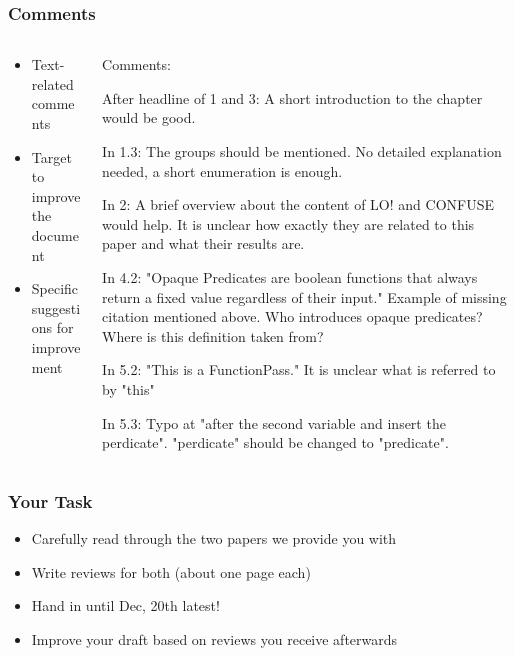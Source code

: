 \documentclass[xcolor={usenames,dvipsnames}]{beamer}
\begin{document}
\begin{frame}
	\frametitle{Comments}

	\begin{columns}
		\begin{column}{0.5\linewidth}
			\begin{itemize}
				\item Text-related comments
				\item Target to improve the document
				\item Specific suggestions for improvement
			\end{itemize}
		\end{column}
		\begin{column}{0.49\linewidth}
			\tiny
			Comments:

			After headline of 1 and 3: A short introduction to the chapter would
			be good.

			In 1.3: The groups should be mentioned. No detailed explanation needed, a short
			enumeration is enough.

			In 2: A brief overview about the content of LO! and CONFUSE would help. It is
			unclear how exactly they are related to this paper and what their results are.

			In 4.2: "Opaque Predicates are boolean functions that always return a fixed
			value regardless of their input." Example of missing citation mentioned above.
			Who introduces opaque predicates? Where is this definition taken from?

			In 5.2: "This is a FunctionPass." It is unclear what is referred to by "this"

			In 5.3: Typo at "after the second variable and insert the perdicate".
			"perdicate" should be changed to "predicate".
		\end{column}
	\end{columns}
\end{frame}

\begin{frame}
	\frametitle{Your Task}

	\begin{itemize}
		\item \alert{Carefully} read through the two papers we provide you with
		\item Write reviews for both (about one page each)
		\item Hand in until \alert{Dec, 20th} latest!
		\item Improve your draft based on reviews you receive afterwards
	\end{itemize}
\end{frame}
\end{document}
